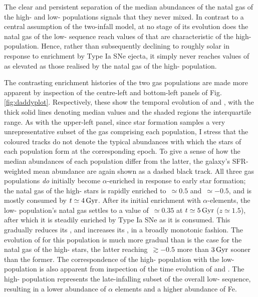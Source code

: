 The clear and persistent separation of the median abundances of the natal gas of the high- and low-\afe{} populations signals that they never mixed. In contrast to a central assumption of the two-infall model, at no stage of its evolution does the natal gas of the low-\afe{} sequence reach values of \afe{} that are characteristic of the high-\afe{} population. Hence, rather than subsequently declining to roughly solar \afe{} in response to enrichment by Type Ia SNe ejecta, it simply never reaches values of \afe{} as elevated as those realised by the natal gas of the high-\afe{} population. 

The contrasting enrichment histories of the two gas populations are made more apparent by inspection of the centre-left and bottom-left panels of Fig. \ref{fig:daddyplot}. Respectively, these show the temporal evolution of \afe{} and \feh{}, with the thick solid lines denoting median values and the shaded regions the interquartile range. As with the upper-left panel, since star formation samples a very unrepresentative subset of the gas comprising each population, I stress that the coloured tracks do not denote the typical abundances with which the stars of each population form at the corresponding epoch. To give a sense of how the median abundances of each population differ from the latter, the galaxy's SFR-weighted mean abundance are again shown as a dashed black track. All three gas populations \emph{do} initially become $\alpha$-enriched in response to early star formation; the natal gas of the high-\afe{} stars is rapidly enriched to \afe{}$\,\simeq 0.5$ and \feh{}$\,\simeq -0.5$, and is mostly consumed by $t\simeq 4\,{\rm Gyr}$. After its initial enrichment with $\alpha$-elements, the low-\afe{} population's natal gas settles to a value of \afe{}$\,\simeq 0.35$ at $t\simeq 5\,{\rm Gyr}$ ($z \simeq 1.5$), after which it is steadily enriched by Type Ia SNe as it is consumed. This gradually reduces its \afe{}, and increases its \feh{}, in a broadly monotonic fashion. The evolution of \feh{} for this population is much more gradual than is the case for the natal gas of the high-\afe{} stars, the latter reaching \feh{}$\,\gtrsim -0.5$ more than $3\,{\rm Gyr}$ sooner than the former. The correspondence of the high-\feh{} population with the low-\afe{} population is also apparent from inspection of the time evolution of \afe{} and \feh{}. The high-\feh{} population represents the late-infalling subset of the overall low-\afe{} sequence, resulting in a lower abundance of $\alpha$ elements and a higher abundance of Fe. 

